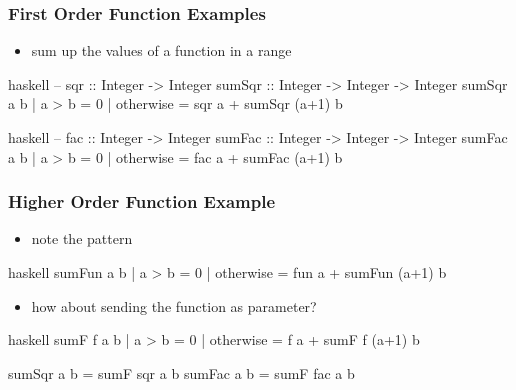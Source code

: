 \documentclass[dvipsnames]{beamer}
\theoremstyle{plain}
\begin{document}
\begin{frame}[fragile]
  \frametitle{First Order Function Examples}

  \begin{itemize}
    \item sum up the values of a function in a range
  \end{itemize}

  \begin{exampleblock}{}
    \begin{pygments}{haskell}
-- sqr :: Integer -> Integer
sumSqr :: Integer -> Integer -> Integer
sumSqr a b
  | a > b     = 0
  | otherwise = sqr a + sumSqr (a+1) b
    \end{pygments}

    \pause
    \begin{pygments}{haskell}
-- fac :: Integer -> Integer
sumFac :: Integer -> Integer -> Integer
sumFac a b
  | a > b     = 0
  | otherwise = fac a + sumFac (a+1) b
    \end{pygments}
  \end{exampleblock}
\end{frame}

\begin{frame}[fragile]
  \frametitle{Higher Order Function Example}

  \begin{itemize}
    \item note the pattern
  \end{itemize}

  \begin{exampleblock}{}
    \begin{pygments}{haskell}
sumFun a b
  | a > b     = 0
  | otherwise = fun a + sumFun (a+1) b
    \end{pygments}
  \end{exampleblock}

  \pause
  \begin{itemize}
    \item how about sending the function as parameter?
  \end{itemize}

  \begin{exampleblock}{}
    \begin{pygments}{haskell}
sumF f a b
  | a > b     = 0
  | otherwise = f a + sumF f (a+1) b

sumSqr a b = sumF sqr a b
sumFac a b = sumF fac a b
    \end{pygments}
  \end{exampleblock}
\end{frame}
\end{document}
